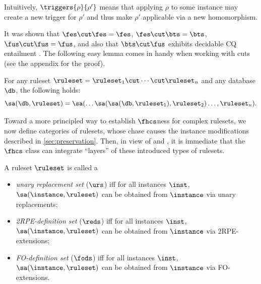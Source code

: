Intuitively, $\triggers{\rho}{\rho'}$ means that applying $\rho$ to some instance may create a new trigger for $\rho'$ and thus make $\rho'$ applicable via a new homomorphism.

%
It was shown that \mbox{$\fes \cut \fes = \fes$}, \mbox{$\fes \cut \bts = \bts$}, \mbox{$\fus \cut \fus = \fus$}, and also that $\bts \cut \fus$ exhibits decidable CQ entailment \cite{BagLecMugSal11}. %
%
The following easy lemma comes in handy when working with cuts (see the appendix for the proof). %

\begin{lemma}\label{lem:n-cut-layered-chase}
For any ruleset $\ruleset = \ruleset_{1} \cut \cdots \cut \ruleset_{n}$ and any database $\db$, the following holds:
$$
\sa(\db,\ruleset) = \sa(\ldots\sa(\sa(\db,\ruleset_{1}),\ruleset_{2}) \ldots, \ruleset_{n}).
$$
\end{lemma}




Toward a more principled way to establish $\fhcs$ness for complex rulesets, we now define categories of rulesets, whose chase causes the instance modifications described in  \cref{sec:preservation}. 
Then, in view of  and , it is immediate that the $\fhcs$ class can integrate ``layers'' of these introduced types of rulesets.  

\begin{definition}
A ruleset $\ruleset$ is called a
\begin{itemize}
\item 
\emph{unary replacement set} ($\urs$) iff  for all instances $\inst$, $\sa(\instance,\ruleset)$ can be obtained from $\instance$ via unary replacements; 
\item 
\emph{2RPE-definition set} ($\reds$) iff  for all instances $\inst$, $\sa(\instance,\ruleset)$ can be obtained from $\instance$ via 2RPE-extensions;
\item 
\emph{FO-definition set} ($\fods$) iff  for all instances $\inst$, $\sa(\instance,\ruleset)$ can be obtained from $\instance$ via FO-extensions. 
\end{itemize}
\end{definition}

